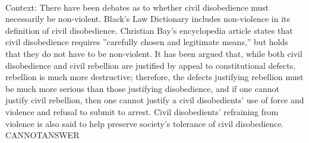 \documentclass[11pt,a4paper, onecolumn]{article}
\begin{document}
\\ Context: There have been debates as to whether civil disobedience must necessarily be non-violent. Black's Law Dictionary includes non-violence in its definition of civil disobedience. Christian Bay's encyclopedia article states that civil disobedience requires ''carefully chosen and legitimate means,'' but holds that they do not have to be non-violent. It has been argued that, while both civil disobedience and civil rebellion are justified by appeal to constitutional defects, rebellion is much more destructive; therefore, the defects justifying rebellion must be much more serious than those justifying disobedience, and if one cannot justify civil rebellion, then one cannot justify a civil disobedients' use of force and violence and refusal to submit to arrest. Civil disobedients' refraining from violence is also said to help preserve society's tolerance of civil disobedience. CANNOTANSWER
\end{document}

